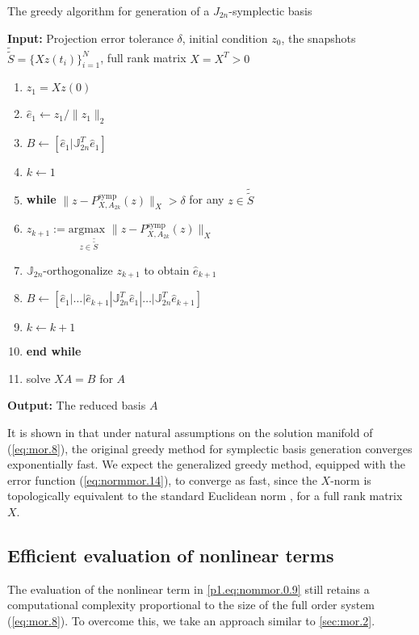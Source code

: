 \begin{algorithm} 
\caption{The greedy algorithm for generation of a $J_{2n}$-symplectic basis} \label{alg:2}
{\bf Input:} Projection error tolerance $\delta$, initial condition $ z_0$, the snapshots $\tilde{\tilde{S}} = \{Xz(t_i)\}_{i=1}^{N}$, full rank matrix $X=X^T>0$
\begin{enumerate}
\item $z_1 = Xz(0)$
\item $\hat e_1 \leftarrow z_1/ \| z_1 \|_2$
\item $B \leftarrow [\hat e_1| \mathbb J_{2n}^T \hat e_1]$
\item $k \leftarrow 1$
\item \textbf{while} $\| z - P^{\text{symp}}_{X,A_{2k}}(z)\|_X > \delta$ for any $z \in \tilde{\tilde{S}}$
\item \hspace{0.5cm} $z_{k+1} := \underset{z\in \tilde{\tilde{S}}}{\text{argmax }} \| z - P^{\text{symp}}_{X,A_{2k}}(z)\|_X$
\item \hspace{0.5cm} $\mathbb J_{2n}$-orthogonalize $z_{k+1}$ to obtain $\hat e_{k+1}$
\item \hspace{0.5cm} $B \leftarrow [\hat e_1|\dots |\hat e_{k+1} | \mathbb J_{2n}^T \hat e_1|\dots| \mathbb J_{2n}^T  \hat e_{k+1}]$
\item \hspace{0.5cm} $k \leftarrow k+1$
\item \textbf{end while}
\item solve $X A = B$ for $A$
\end{enumerate}
\vspace{0.5cm}
{\bf Output:} The reduced basis $A$
\end{algorithm}
It is shown in \cite{doi:10.1137/17M1111991} that under natural assumptions on the solution manifold of (\ref{eq:mor.8}), the original greedy method for symplectic basis generation converges exponentially fast. We expect the generalized greedy method, equipped with the error function (\ref{eq:normmor.14}), to converge as fast, since the $X$-norm is topologically equivalent to the standard Euclidean norm \cite{friedman1970foundations}, for a full rank matrix $X$.

\subsection{Efficient evaluation of nonlinear terms} \label{sec:normmor.3}
The evaluation of the nonlinear term in \eqref{p1.eq:nommor.0.9} still retains a computational complexity proportional to the size of the full order system (\ref{eq:mor.8}). To overcome this, we take an approach similar to \cref{sec:mor.2}. 

